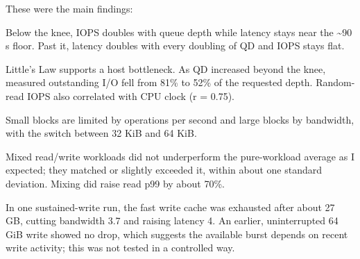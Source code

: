 \documentclass[10pt,letterpaper]{article}
\begin{document}
These were the main findings:


\noindent \textbullet{} Below the knee, IOPS doubles with queue depth while latency stays near the \textasciitilde{}90 \textmu{}s floor. Past it, latency doubles with every doubling of QD and IOPS stays flat.\par\smallskip

\noindent \textbullet{} Little's Law supports a host bottleneck. As QD increased beyond the knee, measured outstanding I/O fell from 81\% to 52\% of the requested depth. Random-read IOPS also correlated with CPU clock (r = 0.75).\par\smallskip

\noindent \textbullet{} Small blocks are limited by operations per second and large blocks by bandwidth, with the switch between 32 KiB and 64 KiB.\par\smallskip

\noindent \textbullet{} Mixed read/write workloads did not underperform the pure-workload average as I expected; they matched or slightly exceeded it, within about one standard deviation. Mixing did raise read p99 by about 70\%.\par\smallskip

\noindent \textbullet{} In one sustained-write run, the fast write cache was exhausted after about 27 GB, cutting bandwidth 3.7\texttimes{} and raising latency 4\texttimes{}. An earlier, uninterrupted 64 GiB write showed no drop, which suggests the available burst depends on recent write activity; this was not tested in a controlled way.\par\smallskip
\end{document}
